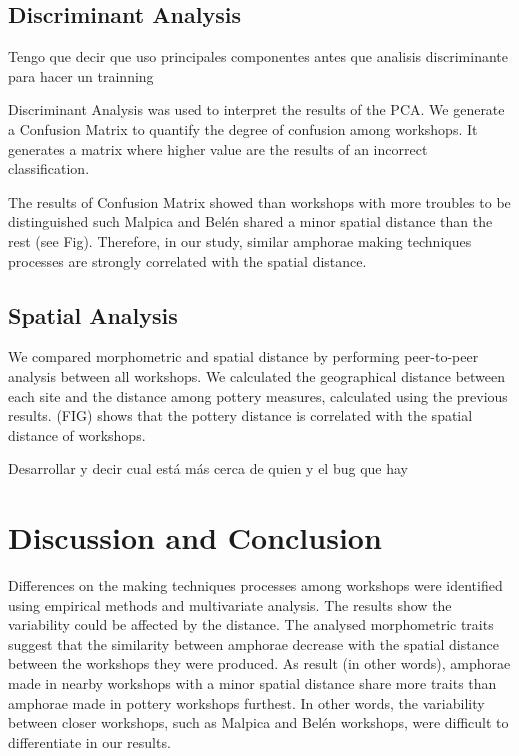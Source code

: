 \documentclass[review]{elsarticle}
\begin{document}
\subsection{Discriminant Analysis}

Tengo que decir que uso principales componentes antes que analisis discriminante para hacer un trainning 

Discriminant Analysis was used to interpret the results of the PCA. We generate a Confusion Matrix to quantify the degree of confusion among workshops. It generates a matrix where higher value are the results of an incorrect classification. 





The results of Confusion Matrix showed than workshops with more troubles to be distinguished such Malpica and Belén shared a minor spatial distance than the rest (see Fig). Therefore, in our study, similar amphorae making techniques processes are strongly correlated with the spatial distance. 

\subsection{Spatial Analysis}

We compared morphometric and spatial distance by performing peer-to-peer analysis between all workshops. We calculated the geographical distance between each site and the distance among pottery measures, calculated using the previous results. (FIG) shows that the pottery distance is correlated with the spatial distance of workshops.

Desarrollar y decir cual está más cerca de quien y el bug que hay


\section{Discussion and Conclusion}

Differences on the making techniques processes among workshops were identified using empirical methods and  multivariate analysis. The results show the variability could be affected by the distance. The analysed morphometric traits suggest that the similarity between amphorae decrease with the spatial distance between the workshops they were produced. As result (in other words), amphorae made in nearby workshops with a minor spatial distance share more traits than amphorae made in pottery workshops furthest. In other words, the variability between closer workshops, such as Malpica and Bel\'en workshops, were difficult to differentiate in our results.  
\end{document}
